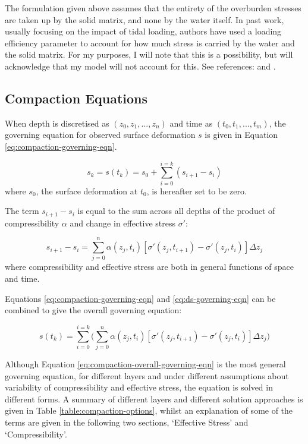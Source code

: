 \documentclass{article}
\begin{document}
The formulation given above assumes that the entirety of the overburden stresses are taken up by the solid matrix, and none by the water itself. In past work, usually focusing on the impact of tidal loading, authors have used a loading efficiency parameter to account for how much stress is carried by the water and the solid matrix. For my purposes, I will note that this is a possibility, but will acknowledge that my model will not account for this. See references: \cite{burgess_terrestrial_2017} and \cite{reeves_incorporation_2000}.


\subsection{Compaction Equations}

When depth is discretised as $(z_0, z_1, ..., z_n)$ and time as $(t_0, t_1, ..., t_m)$, the governing equation for observed surface deformation $s$ is given in Equation \ref{eq:compaction-governing-eqn}.

\begin{equation}
s_k = s(t_k) = s_0 + \sum_{i=0}^{i=k} (s_{i+1} - s_i)
\label{eq:compaction-governing-eqn}
\end{equation}
where $s_0$, the surface deformation at $t_0$, is hereafter set to be zero.

The term $s_{i+1} - s_i$ is equal to the sum across all depths of the product of compressibility $\alpha$ and change in effective stress $\sigma'$:

\begin{equation}
s_{i+1} - s_i = \sum_{j=0}^{n} \alpha(z_j,t_i) [\sigma'(z_j,t_{i+1}) - \sigma'(z_j,t_i) ] \Delta z_j
\label{eq:ds-governing-eqn}
\end{equation}
where compressibility and effective stress are both in general functions of space and time.

Equations \ref{eq:compaction-governing-eqn} and \ref{eq:ds-governing-eqn} can be combined to give the overall governing equation:

\begin{equation}
s(t_k) = \sum_{i=0}^{i=k} \bigg(  \sum_{j=0}^{n} \alpha(z_j,t_i) [\sigma'(z_j,t_{i+1}) - \sigma'(z_j,t_i) ] \Delta z_j \bigg)
\label{eq:compaction-overall-governing-eqn}
\end{equation}

Although Equation \ref{eq:compaction-overall-governing-eqn} is the most general governing equation, for different layers and under different assumptions about variability of compressibility and effective stress, the equation is solved in different forms. A summary of different layers and different solution approaches is given in Table \ref{table:compaction-options}, whilst an explanation of some of the terms are given in the following two sections, `Effective Stress' and `Compressibility'.
\end{document}
